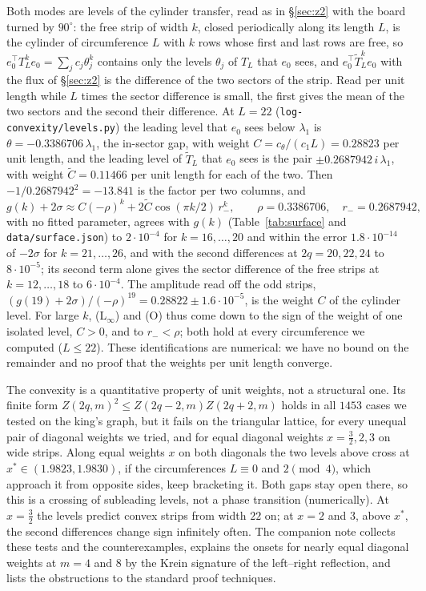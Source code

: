 \documentclass[11pt]{amsart}
\theoremstyle{definition}
\theoremstyle{remark}
\newcommand{\file}[1]{\texttt{#1}}
\begin{document}
Both modes are levels of the cylinder transfer, read as in \S\ref{sec:z2} with the board turned by
$90^\circ$: the free strip of width $k$, closed periodically along its length $L$, is the cylinder of
circumference $L$ with $k$ rows whose first and last rows are free, so
$e_0^{\top} T_L^k e_0 = \sum_j c_j \theta_j^k$ contains only the levels $\theta_j$ of $T_L$ that
$e_0$ sees, and $e_0^{\top} \tilde T_L^k e_0$ with the flux of \S\ref{sec:z2} is the difference of
the two sectors of the strip. Read per unit length while $L$ times the sector difference is small,
the first gives the mean of the two sectors and the second their difference. At $L = 22$ (\file{log-convexity/levels.py}) the leading
level that $e_0$ sees below $\lambda_1$ is $\theta = -0.3386706\,\lambda_1$, the in-sector gap, with
weight $C = c_\theta/(c_1 L) = 0.28823$ per unit length, and the leading level of $\tilde T_L$ that
$e_0$ sees is the pair $\pm 0.2687942\,i\,\lambda_1$, with weight $\tilde C = 0.11466$ per unit length
for each of the two. Then $-1/0.2687942^2 = -13.841$ is the factor per two columns, and
\[
  g(k) + 2\sigma \approx C(-\rho)^k + 2\tilde C \cos(\pi k/2)\, r_-^k, \qquad
  \rho = 0.3386706, \quad r_- = 0.2687942,
\]
with no fitted parameter, agrees with $g(k)$ (Table~\ref{tab:surface} and \file{data/surface.json})
to $2\cdot10^{-4}$ for $k = 16, \dots, 20$ and within the error $1.8\cdot10^{-14}$ of $-2\sigma$ for
$k = 21, \dots, 26$, and with the second differences at $2q = 20, 22, 24$ to $8\cdot10^{-5}$; its second term alone gives the sector
difference of the free strips at $k = 12, \dots, 18$ to $6\cdot10^{-4}$. The amplitude read off the odd
strips, $(g(19) + 2\sigma)/(-\rho)^{19} = 0.28822 \pm 1.6\cdot10^{-5}$, is the weight $C$ of the
cylinder level. For large $k$, (L$_\infty$) and (O) thus come down to the sign of the weight of one
isolated level, $C > 0$, and to $r_- < \rho$; both hold at every circumference we computed
($L \le 22$). These identifications are numerical: we have no bound on the remainder and no proof
that the weights per unit length converge.

The convexity is a quantitative property of unit weights, not a structural one. Its finite form
$Z(2q, m)^2 \le Z(2q-2, m)Z(2q+2, m)$ holds in all $1453$ cases we tested on the king's graph, but it
fails on the triangular lattice, for every unequal pair of diagonal weights we tried, and for equal
diagonal weights $x = \tfrac32, 2, 3$ on wide strips. Along equal weights $x$ on both diagonals the
two levels above cross at $x^* \in (1.9823, 1.9830)$, if the circumferences $L \equiv 0$ and
$2 \pmod 4$, which approach it from opposite sides, keep bracketing it. Both gaps stay open there, so
this is a crossing of subleading levels, not a phase transition (numerically). At $x = \tfrac32$ the
levels predict convex strips from width $22$ on; at $x = 2$ and $3$, above $x^*$, the second
differences change sign infinitely often. The companion note \cite{rylko2026lnote} collects these tests
and the counterexamples, explains the onsets for nearly equal diagonal weights at $m = 4$ and $8$ by
the Krein signature of the left--right reflection, and lists the obstructions to the standard proof
techniques.
\end{document}
